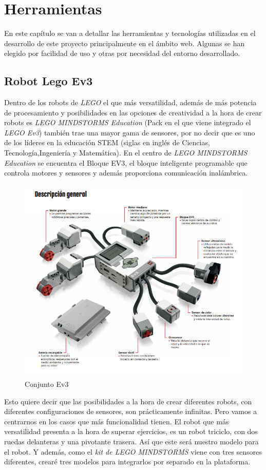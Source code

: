 \chapter{Herramientas}
\label{chap:herramientas}
En este capítulo se van a detallar las herramientas y tecnologías utilizadas en el desarrollo de este proyecto principalmente en el ámbito web. Algunas se han elegido por facilidad de uso y otras por necesidad del entorno desarrollado.

\section{Robot Lego Ev3}
\label{sec:caracteristicas} 
Dentro de los robots de \textit{LEGO} el que más versatilidad, además de más potencia de procesamiento y posibilidades en las opciones de creatividad a la hora de crear robots es \textit{LEGO MINDSTORMS Education}\cite{bib:mindstorm} (Pack en el que viene integrado el \textit{LEGO Ev3}) también trae una mayor gama de sensores, por no decir que es uno de los líderes en la educación STEM (siglas en inglés de Ciencias, Tecnología,Ingeniería y Matemática). En el centro de \textit{LEGO MINDSTORMS Education} se encuentra el Bloque EV3, el bloque inteligente programable que controla motores y sensores y además proporciona comunicación inalámbrica.
 \begin{figure}[H]
    \centering
    \includegraphics[scale=0.7]{img/partes.png}
    \caption{Conjunto Ev3} \label{fig:partes}
\end{figure}
 Esto quiere decir que las posibilidades a la hora de crear diferentes robots, con diferentes configuraciones de sensores, son prácticamente infinitas. Pero vamos a centrarnos en los casos que más funcionalidad tienen. El robot que más versatilidad presenta a la hora de superar ejercicios, es un robot triciclo, con dos ruedas delanteras y una pivotante trasera. Así que este será nuestro modelo para el robot. Y además, como el \textit{kit de LEGO MINDSTORMS} viene con tres sensores diferentes, crearé tres modelos para integrarlos por separado en la plataforma.

